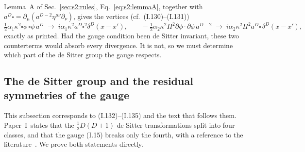 \documentclass[aps,prd,onecolumn,10pt,nofootinbib,floatfix]{revtex4-2}
\newcommand{\PI}{Paper~I}
\newcommand{\eqI}[1]{(I.#1)}
\begin{document}
Lemma~A of Sec.~\ref{sec:s2:rules}, Eq.~\eqref{eq:s2:lemmaA}, together with $a^D\square=\partial_\mu(a^{D-2}\eta^{\mu\nu}\partial_\nu)$, gives the vertices (cf.\ \eqI{130}--\eqI{131})
\begin{equation}
\tfrac12\alpha_1\kappa^2\square\phi\,\square\phi\,a^D\;\longrightarrow\;i\alpha_1\kappa^2a^D\square^2\delta^D(x-x'),\qquad
-\tfrac12\alpha_2\kappa^2H^2\partial\phi\cdot\partial\phi\,a^{D-2}\;\longrightarrow\;i\alpha_2\kappa^2H^2a^D\square\,\delta^D(x-x'),
\label{eq:s5:invvert}
\end{equation}
exactly as printed.
Had the gauge condition been de Sitter invariant, these two counterterms would absorb every divergence.
It is not, so we must determine which part of the de Sitter group the gauge respects.

\subsection{The de Sitter group and the residual symmetries of the gauge}
\label{sec:s5:dS}

This subsection corresponds to \eqI{132}--\eqI{135} and the text that follows them.
\PI\ states that the $\frac12D(D+1)$ de Sitter transformations split into four classes, and that the gauge \eqI{15} breaks only the fourth, with a reference to the literature~\cite{ref:Miao2006}.
We prove both statements directly.
\end{document}
